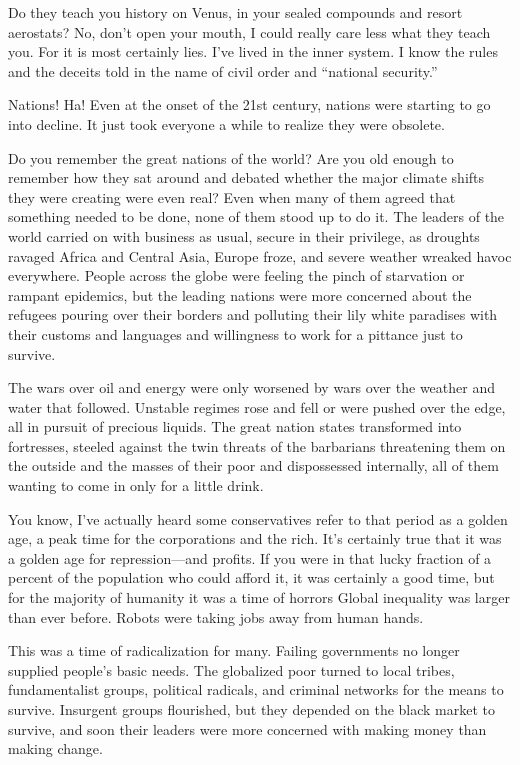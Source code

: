Do they teach you history on Venus, in your sealed 
compounds and resort aerostats? No, don't open 
your mouth, I could really care less what they teach 
you. For it is most certainly lies. I've lived in the inner 
system. I know the rules and the deceits told in the 
name of civil order and ``national security.''

Nations! Ha! Even at the onset of the 21st century, 
nations were starting to go into decline. It just took 
everyone a while to realize they were obsolete.

Do you remember the great nations of the world? 
Are you old enough to remember how they sat around 
and debated whether the major climate shifts they 
were creating were even real? Even when many of 
them agreed that something needed to be done, none 
of them stood up to do it. The leaders of the world 
carried on with business as usual, secure in their 
privilege, as droughts ravaged Africa and Central 
Asia, Europe froze, and severe weather wreaked havoc 
everywhere. People across the globe were feeling the 
pinch of starvation or rampant epidemics, but the 
leading nations were more concerned about the refugees
pouring over their borders and polluting their lily
white paradises with their customs and languages and 
willingness to work for a pittance just to survive.

The wars over oil and energy were only worsened 
by wars over the weather and water that followed. 
Unstable regimes rose and fell or were pushed over 
the edge, all in pursuit of precious liquids. The great 
nation states transformed into fortresses, steeled 
against the twin threats of the barbarians threatening 
them on the outside and the masses of their poor and 
dispossessed internally, all of them wanting to come 
in only for a little drink.

You know, I've actually heard some conservatives 
refer to that period as a golden age, a peak time for 
the corporations and the rich. It's certainly true that 
it was a golden age for repression—and profits. If you 
were in that lucky fraction of a percent of the population
who could afford it, it was certainly a good time,
but for the majority of humanity it was a time of horrors
Global inequality was larger than ever before.
Robots were taking jobs away from human hands.

This was a time of radicalization for many. Failing 
governments no longer supplied people's basic needs. 
The globalized poor turned to local tribes, fundamentalist
groups, political radicals, and criminal networks
for the means to survive. Insurgent groups flourished, 
but they depended on the black market to survive, 
and soon their leaders were more concerned with 
making money than making change.

